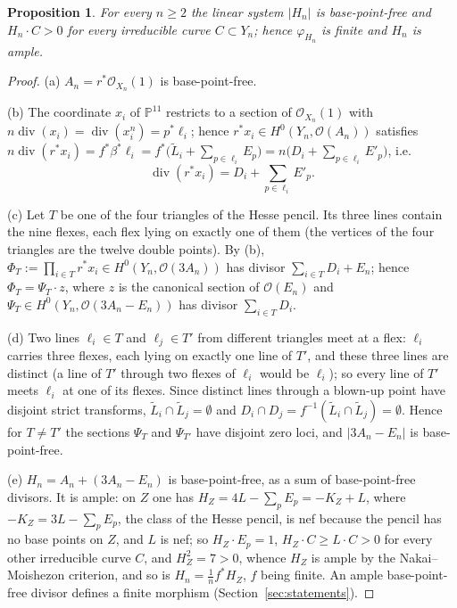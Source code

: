 \documentclass[10pt,a4paper]{amsart}
\newtheorem{proposition}{Proposition}
\newcommand{\PP}{\mathbb{P}}
\newcommand{\cO}{\mathcal{O}}
\begin{document}
\begin{proposition}\label{prop:bpf}
For every $n\ge2$ the linear system $|H_n|$ is base-point-free and $H_n\cdot C>0$ for every irreducible curve $C\subset Y_n$; hence $\varphi_{H_n}$ is finite and $H_n$ is ample.
\end{proposition}

\begin{proof}
(a) $A_n=r^*\cO_{X_n}(1)$ is base-point-free.

(b) The coordinate $x_i$ of $\PP^{11}$ restricts to a section of $\cO_{X_n}(1)$ with $n\operatorname{div}(x_i)=\operatorname{div}(x_i^n)=p^*\ell_i$; hence $r^*x_i\in H^0(Y_n,\cO(A_n))$ satisfies $n\operatorname{div}(r^*x_i)=f^*\beta^*\ell_i=f^*\bigl(\tilde L_i+\sum_{p\in\ell_i}E_p\bigr)=n\bigl(D_i+\sum_{p\in\ell_i}E'_p\bigr)$, i.e.
\[
\operatorname{div}(r^*x_i)=D_i+\sum_{p\in\ell_i}E'_p .
\]

(c) Let $T$ be one of the four triangles of the Hesse pencil. Its three lines contain the nine flexes, each flex lying on exactly one of them (the vertices of the four triangles are the twelve double points). By (b), $\Phi_T:=\prod_{i\in T}r^*x_i\in H^0(Y_n,\cO(3A_n))$ has divisor $\sum_{i\in T}D_i+E_n$; hence $\Phi_T=\Psi_T\cdot z$, where $z$ is the canonical section of $\cO(E_n)$ and $\Psi_T\in H^0(Y_n,\cO(3A_n-E_n))$ has divisor $\sum_{i\in T}D_i$.

(d) Two lines $\ell_i\in T$ and $\ell_j\in T'$ from different triangles meet at a flex: $\ell_i$ carries three flexes, each lying on exactly one line of $T'$, and these three lines are distinct (a line of $T'$ through two flexes of $\ell_i$ would be $\ell_i$); so every line of $T'$ meets $\ell_i$ at one of its flexes. Since distinct lines through a blown-up point have disjoint strict transforms, $\tilde L_i\cap\tilde L_j=\emptyset$ and $D_i\cap D_j=f^{-1}(\tilde L_i\cap\tilde L_j)=\emptyset$. Hence for $T\ne T'$ the sections $\Psi_T$ and $\Psi_{T'}$ have disjoint zero loci, and $|3A_n-E_n|$ is base-point-free.

(e) $H_n=A_n+(3A_n-E_n)$ is base-point-free, as a sum of base-point-free divisors. It is ample: on $Z$ one has $H_Z=4L-\sum_pE_p=-K_Z+L$, where $-K_Z=3L-\sum_pE_p$, the class of the Hesse pencil, is nef because the pencil has no base points on $Z$, and $L$ is nef; so $H_Z\cdot E_p=1$, $H_Z\cdot C\ge L\cdot C>0$ for every other irreducible curve $C$, and $H_Z^2=7>0$, whence $H_Z$ is ample by the Nakai--Moishezon criterion, and so is $H_n=\tfrac1nf^*H_Z$, $f$ being finite. An ample base-point-free divisor defines a finite morphism (Section~\ref{sec:statements}).
\end{proof}
\end{document}
